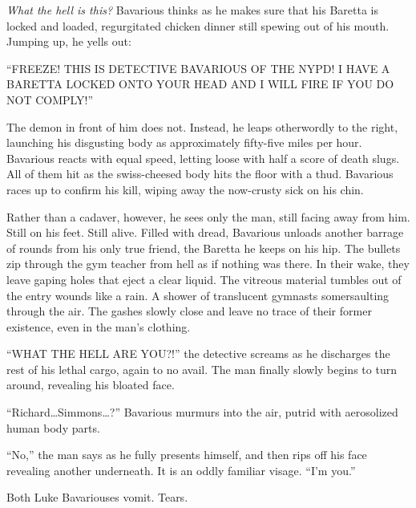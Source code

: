 {\em What the hell is this?} Bavarious thinks as he makes sure
that his Baretta is locked and loaded, regurgitated chicken dinner
still spewing out of his mouth. Jumping up, he yells out:



``FREEZE! THIS IS DETECTIVE BAVARIOUS OF THE NYPD! I HAVE A
BARETTA LOCKED ONTO YOUR HEAD AND I WILL FIRE IF YOU DO NOT
COMPLY!''



The demon in front of him does not. Instead, he leaps otherwordly
to the right, launching his disgusting body as approximately
fifty-five miles per hour. Bavarious reacts with equal speed,
letting loose with half a score of death slugs. All of them hit as
the swiss-cheesed body hits the floor with a thud. Bavarious races
up to confirm his kill, wiping away the now-crusty sick on his
chin.



Rather than a cadaver, however, he sees only the man, still facing
away from him. Still on his feet. Still alive. Filled with dread,
Bavarious unloads another barrage of rounds from his only true
friend, the Baretta he keeps on his hip. The bullets zip through
the gym teacher from hell as if nothing was there. In their wake,
they leave gaping holes that eject a clear liquid. The vitreous
material tumbles out of the entry wounds like a rain. A shower of
translucent gymnasts somersaulting through the air. The gashes
slowly close and leave no trace of their former existence, even in
the man's clothing.



``WHAT THE HELL ARE YOU?!'' the detective screams as he
discharges the rest of his lethal cargo, again to no avail. The man
finally slowly begins to turn around, revealing his bloated
face.



``Richard{\ldots}Simmons{\ldots}?'' Bavarious murmurs
into the air, putrid with aerosolized human body parts.



``No,'' the man says as he fully presents himself, and
then rips off his face revealing another underneath. It is an oddly
familiar visage. ``I'm you.''



Both Luke Bavariouses vomit. Tears.


 



